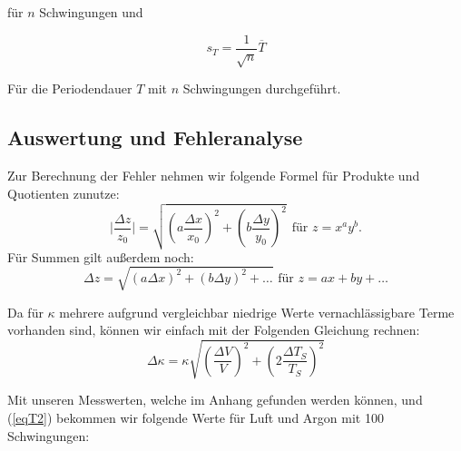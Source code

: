 \documentclass[11pt,a4paper]{article}
\begin{document}
f\"ur $n$ Schwingungen und

\begin{equation}
s_T=\frac{1}{\sqrt{n}}\overline{T}\label{equt}
\end{equation}

F\"ur die Periodendauer $T$ mit $n$ Schwingungen durchgef\"uhrt.

\subsection{Auswertung und Fehleranalyse}

%

Zur Berechnung der Fehler nehmen wir folgende Formel f\"ur Produkte  und Quotienten zunutze:
\begin{equation}
\vert\frac{\Delta z}{z_0}\vert = \sqrt{\left({a\frac{\Delta x}{x_0}}\right)^2+\left({b\frac{\Delta y}{y_0}}\right)^2} \ \ \textrm{f\"ur } z=x^a y^b. 
\end{equation}
F\"ur Summen gilt au\ss erdem noch:
\begin{equation}
\Delta z = \sqrt{(a\Delta x)^2 + (b \Delta y)^2+\ldots} \textrm{  f\"ur } z = ax+by+\ldots
\end{equation}


Da f\"ur $\kappa$ mehrere aufgrund vergleichbar niedrige Werte vernachl\"assigbare Terme vorhanden sind, k\"onnen wir einfach mit der Folgenden Gleichung rechnen:
$$ \Delta \kappa  = \kappa \sqrt{\left({\frac{\Delta V}{V}}\right)^2 + \left({2\frac{\Delta T_S}{T_S}}\right)^2} $$

Mit unseren Messwerten, welche im Anhang gefunden werden k\"onnen, und (\ref{eqT2}) bekommen wir folgende Werte f\"ur Luft und Argon mit 100 Schwingungen:
\end{document}
